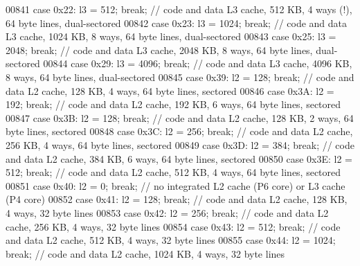 \begin{DoxyCode}
{00841       \textcolor{keywordflow}{case} 0x22: l3 = 512; \textcolor{keywordflow}{break};   \textcolor{comment}{// code and data L3 cache, 512 KB, 4 ways (!), 64 byte lines,
       dual-sectored}
00842       \textcolor{keywordflow}{case} 0x23: l3 = 1024; \textcolor{keywordflow}{break};   \textcolor{comment}{// code and data L3 cache, 1024 KB, 8 ways, 64 byte lines,
       dual-sectored}
00843       \textcolor{keywordflow}{case} 0x25: l3 = 2048; \textcolor{keywordflow}{break};   \textcolor{comment}{// code and data L3 cache, 2048 KB, 8 ways, 64 byte lines,
       dual-sectored}
00844       \textcolor{keywordflow}{case} 0x29: l3 = 4096; \textcolor{keywordflow}{break};   \textcolor{comment}{// code and data L3 cache, 4096 KB, 8 ways, 64 byte lines,
       dual-sectored}
00845       \textcolor{keywordflow}{case} 0x39: l2 = 128; \textcolor{keywordflow}{break};   \textcolor{comment}{// code and data L2 cache, 128 KB, 4 ways, 64 byte lines, sectored}
00846       \textcolor{keywordflow}{case} 0x3A: l2 = 192; \textcolor{keywordflow}{break};   \textcolor{comment}{// code and data L2 cache, 192 KB, 6 ways, 64 byte lines, sectored}
00847       \textcolor{keywordflow}{case} 0x3B: l2 = 128; \textcolor{keywordflow}{break};   \textcolor{comment}{// code and data L2 cache, 128 KB, 2 ways, 64 byte lines, sectored}
00848       \textcolor{keywordflow}{case} 0x3C: l2 = 256; \textcolor{keywordflow}{break};   \textcolor{comment}{// code and data L2 cache, 256 KB, 4 ways, 64 byte lines, sectored}
00849       \textcolor{keywordflow}{case} 0x3D: l2 = 384; \textcolor{keywordflow}{break};   \textcolor{comment}{// code and data L2 cache, 384 KB, 6 ways, 64 byte lines, sectored}
00850       \textcolor{keywordflow}{case} 0x3E: l2 = 512; \textcolor{keywordflow}{break};   \textcolor{comment}{// code and data L2 cache, 512 KB, 4 ways, 64 byte lines, sectored}
00851       \textcolor{keywordflow}{case} 0x40: l2 = 0; \textcolor{keywordflow}{break};   \textcolor{comment}{// no integrated L2 cache (P6 core) or L3 cache (P4 core)}
00852       \textcolor{keywordflow}{case} 0x41: l2 = 128; \textcolor{keywordflow}{break};   \textcolor{comment}{// code and data L2 cache, 128 KB, 4 ways, 32 byte lines}
00853       \textcolor{keywordflow}{case} 0x42: l2 = 256; \textcolor{keywordflow}{break};   \textcolor{comment}{// code and data L2 cache, 256 KB, 4 ways, 32 byte lines}
00854       \textcolor{keywordflow}{case} 0x43: l2 = 512; \textcolor{keywordflow}{break};   \textcolor{comment}{// code and data L2 cache, 512 KB, 4 ways, 32 byte lines}
00855       \textcolor{keywordflow}{case} 0x44: l2 = 1024; \textcolor{keywordflow}{break};   \textcolor{comment}{// code and data L2 cache, 1024 KB, 4 ways, 32 byte lines}
}
\end{DoxyCode}
